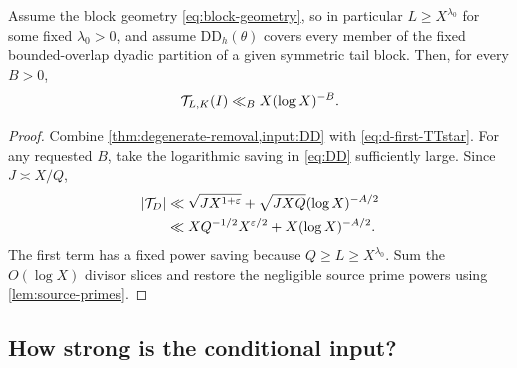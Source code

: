 \begin{proposition}
\label{prop:conditional-closure}
Assume the block geometry \eqref{eq:block-geometry}, so in particular
$L\ge X^{\lambda_0}$ for some fixed $\lambda_0>0$, and assume
$\mathrm{DD}_h(\theta)$ covers every member of the fixed bounded-overlap
dyadic partition of a given symmetric tail block.  Then, for every
$B>0$,
\begin{equation}
 \mathcal T_{L,K}(I)\ll_BX(\log X)^{-B}.
 \label{eq:conditional-tail-closure}
\end{equation}
\end{proposition}

\begin{proof}
Combine \cref{thm:degenerate-removal,input:DD} with
\eqref{eq:d-first-TTstar}.  For any requested $B$, take the logarithmic
saving in \eqref{eq:DD} sufficiently large.  Since $J\asymp X/Q$,
\begin{align*}
 |\mathcal T_D|
 &\ll \sqrt{JX^{1+\varepsilon}}
     +\sqrt{JXQ}(\log X)^{-A/2}\\
 &\ll XQ^{-1/2}X^{\varepsilon/2}+X(\log X)^{-A/2}.
\end{align*}
The first term has a fixed power saving because $Q\ge L\ge
X^{\lambda_0}$.  Sum the $O(\log X)$ divisor slices and restore the
negligible source prime powers using \cref{lem:source-primes}.
\end{proof}

\subsection{How strong is the conditional input?}

